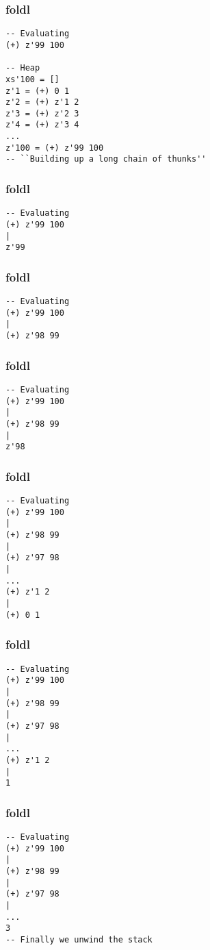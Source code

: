 \documentclass{beamer}
\begin{document}
\begin{frame}[t,fragile]
\frametitle{foldl}
\begin{verbatim}
-- Evaluating
(+) z'99 100

-- Heap
xs'100 = []
z'1 = (+) 0 1
z'2 = (+) z'1 2
z'3 = (+) z'2 3
z'4 = (+) z'3 4
...
z'100 = (+) z'99 100
-- ``Building up a long chain of thunks''
\end{verbatim}
\end{frame}

\begin{frame}[t,fragile]
\frametitle{foldl}
\begin{verbatim}
-- Evaluating
(+) z'99 100
|
z'99
\end{verbatim}
\end{frame}

\begin{frame}[t,fragile]
\frametitle{foldl}
\begin{verbatim}
-- Evaluating
(+) z'99 100
|
(+) z'98 99
\end{verbatim}
\end{frame}

\begin{frame}[t,fragile]
\frametitle{foldl}
\begin{verbatim}
-- Evaluating
(+) z'99 100
|
(+) z'98 99
|
z'98
\end{verbatim}
\end{frame}

\begin{frame}[t,fragile]
\frametitle{foldl}
\begin{verbatim}
-- Evaluating
(+) z'99 100
|
(+) z'98 99
|
(+) z'97 98
|
...
(+) z'1 2
|
(+) 0 1
\end{verbatim}
\end{frame}

\begin{frame}[t,fragile]
\frametitle{foldl}
\begin{verbatim}
-- Evaluating
(+) z'99 100
|
(+) z'98 99
|
(+) z'97 98
|
...
(+) z'1 2
|
1
\end{verbatim}
\end{frame}

\begin{frame}[t,fragile]
\frametitle{foldl}
\begin{verbatim}
-- Evaluating
(+) z'99 100
|
(+) z'98 99
|
(+) z'97 98
|
...
3
-- Finally we unwind the stack
\end{verbatim}
\end{frame}
\end{document}
